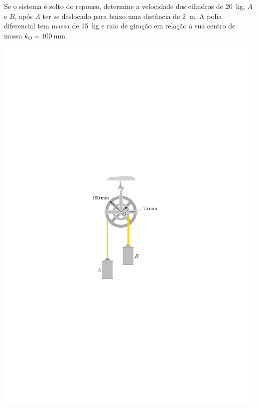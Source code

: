 \item Se o sistema é solto do repouso, determine a velocidade dos cilindros de \SI{20}{\kilogram}, $A$ e $B$, após $A$ ter se
deslocado para baixo uma distância de \SI{2}{\meter}. A polia diferencial tem massa de \SI{15}{\kilogram} e raio de giração
em relação a sua centro de massa $k_{O}=\SI{100}{\milli\meter}$.

\begin{flushright}
	\includegraphics[scale=1.]{../../images/draw_3}
\end{flushright}